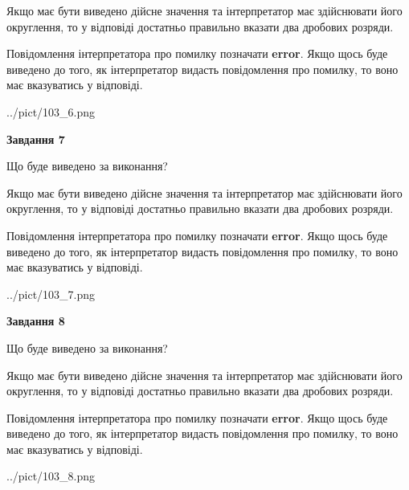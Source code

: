 \documentclass[12pt, ukrainian]{article}
\begin{document}
{\begin {Large}
Якщо має бути виведено дійсне значення та інтерпретатор має здійснювати його округлення, 
то у відповіді достатньо правильно вказати два дробових розряди.

Повідомлення інтерпретатора про помилку позначати \textbf{error}.
Якщо щось буде виведено до того, як інтерпретатор видасть повідомлення про помилку, 
то воно має вказуватись у відповіді. \par

\begin{center}
	{../pict/103_6.png}
\end{center}
\newpage

{\begin {center}\textbf{Завдання 7}\end {center}}\par
Що буде виведено за виконання? \par

Якщо має бути виведено дійсне значення та інтерпретатор має здійснювати його округлення, 
то у відповіді достатньо правильно вказати два дробових розряди.

Повідомлення інтерпретатора про помилку позначати \textbf{error}.
Якщо щось буде виведено до того, як інтерпретатор видасть повідомлення про помилку, 
то воно має вказуватись у відповіді. \par

\begin{center}
	{../pict/103_7.png}
\end{center}
\newpage

{\begin {center}\textbf{Завдання 8}\end {center}}\par
Що буде виведено за виконання? \par

Якщо має бути виведено дійсне значення та інтерпретатор має здійснювати його округлення, 
то у відповіді достатньо правильно вказати два дробових розряди.

Повідомлення інтерпретатора про помилку позначати \textbf{error}.
Якщо щось буде виведено до того, як інтерпретатор видасть повідомлення про помилку, 
то воно має вказуватись у відповіді. \par

\begin{center}
	{../pict/103_8.png}
\end{center}
\newpage


\end{Large}}
\end{document}
